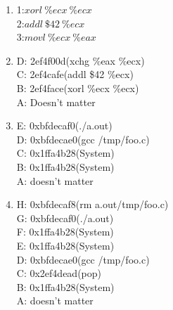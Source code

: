 \documentclass[11pt]{article}
\newenvironment{qparts}{\begin{enumerate}[{(}a{)}]}{\end{enumerate}}
\newcommand{\tab}{\hspace*{2em}}
\begin{document}
\begin{qparts}
\item
1:\tab$xorl\ \%ecx\ \%ecx $\\
2:\tab$addl\ \$42\ \%ecx $\\
3:\tab$movl\ \%ecx\ \%eax $\\

\item
D: 2ef4f00d\tab(xchg \%eax \%ecx)\\
C: 2ef4cafe\tab(addl \$42 \%ecx)\\
B: 2ef4face\tab(xorl \%ecx \%ecx)\\
A: Doesn't matter\\

\item
E: 0xbfdecaf0\tab(./a.out)\\
D: 0xbfdecae0\tab(gcc /tmp/foo.c)\\
C: 0x1ffa4b28\tab(System)\\
B: 0x1ffa4b28\tab(System)\\
A: doesn't matter


\item
H: 0xbfdecaf8\tab(rm a.out/tmp/foo.c)\\
G: 0xbfdecaf0\tab(./a.out)\\
F: 0x1ffa4b28\tab(System)\\
E: 0x1ffa4b28\tab(System)\\
D: 0xbfdecae0\tab(gcc /tmp/foo.c) \\
C: 0x2ef4dead\tab(pop) \\
B: 0x1ffa4b28\tab(System)\\
A: doesn't matter


\end{qparts}
\end{document}
